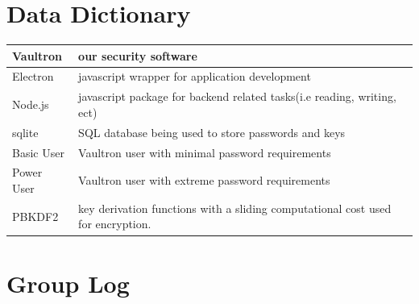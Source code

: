 \documentclass[11pt]{report}
\begin{document}
\begin{appendices}
    \chapter{Data Dictionary}

    \tabulinesep=1.2mm
    \begin{tabu} to 0.97\textwidth { | X[l] | X[l] | }
        \hline
        Vaultron & our security software  \\
        \hline
        Electron  & javascript wrapper for application development  \\
        \hline
        Node.js  & javascript package for backend related tasks(i.e reading, writing, ect) \\
        \hline
        sqlite  & SQL database being used to store passwords and keys\\
        \hline
        Basic User  & Vaultron user with minimal password requirements \\
        \hline
        Power User  & Vaultron user with extreme password requirements \\
        \hline
        PBKDF2 &  key derivation functions with a sliding computational cost used for encryption. \\
        \hline
    \end{tabu}


    \chapter{Group Log}
\end{appendices}
\end{document}
